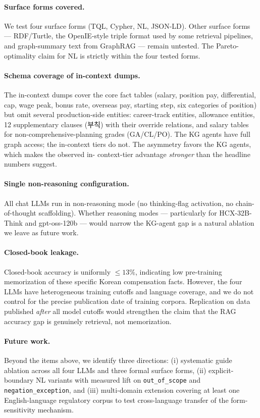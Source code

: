 \paragraph{Surface forms covered.}
We test four surface forms (TQL, Cypher, NL, JSON-LD). Other
surface forms — RDF/Turtle, the OpenIE-style triple format used by
some retrieval pipelines, and graph-summary text from GraphRAG —
remain untested. The Pareto-optimality claim for NL is strictly
within the four tested forms.

\paragraph{Schema coverage of in-context dumps.}
The in-context dumps cover the core fact tables (salary, position
pay, differential, cap, wage peak, bonus rate, overseas pay,
starting step, six categories of position) but omit several
production-side entities: career-track entities, allowance entities,
12 supplementary clauses (부칙) with their override relations, and
salary tables for non-comprehensive-planning grades (GA/CL/PO).
The KG agents have full graph access; the in-context tiers do not.
The asymmetry favors the KG agents, which makes the observed in-
context-tier advantage \emph{stronger} than the headline numbers
suggest.

\paragraph{Single non-reasoning configuration.}
All chat LLMs run in non-reasoning mode (no thinking-flag
activation, no chain-of-thought scaffolding). Whether reasoning
modes — particularly for HCX-32B-Think and gpt-oss-120b — would
narrow the KG-agent gap is a natural ablation we leave as future
work.

\paragraph{Closed-book leakage.}
Closed-book accuracy is uniformly $\leq 13\%$, indicating low
pre-training memorization of these specific Korean compensation
facts. However, the four LLMs have heterogeneous training cutoffs
and language coverage, and we do not control for the precise
publication date of training corpora. Replication on data published
\emph{after} all model cutoffs would strengthen the claim that the
RAG accuracy gap is genuinely retrieval, not memorization.

\paragraph{Future work.}
Beyond the items above, we identify three directions: (i) systematic
guide ablation across all four LLMs and three formal surface forms,
(ii) explicit-boundary NL variants with measured lift on
\texttt{out\_of\_scope} and \texttt{negation\_exception}, and (iii)
multi-domain extension covering at least one English-language
regulatory corpus to test cross-language transfer of the
form-sensitivity mechanism.
